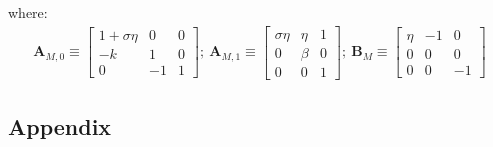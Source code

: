\documentclass{article}
\numberwithin{equation}{section}
\begin{document}
where:
	\begin{align*}
		\textbf{A}_{M,0} \equiv \begin{bmatrix}
									1 + \sigma\eta & 0 & 0\\
									-k & 1 & 0\\
									0 & -1 & 1
								\end{bmatrix};\
		\textbf{A}_{M,1} \equiv \begin{bmatrix}
									\sigma\eta & \eta & 1\\
									0 & \beta & 0\\
									0 & 0 & 1
								\end{bmatrix};\
		\textbf{B}_{M} \equiv   \begin{bmatrix}
									\eta & -1 & 0\\
									0 & 0 & 0\\
									0 & 0 & -1
								\end{bmatrix}
	\end{align*}







\newpage
\subsection{Appendix}
\end{document}
